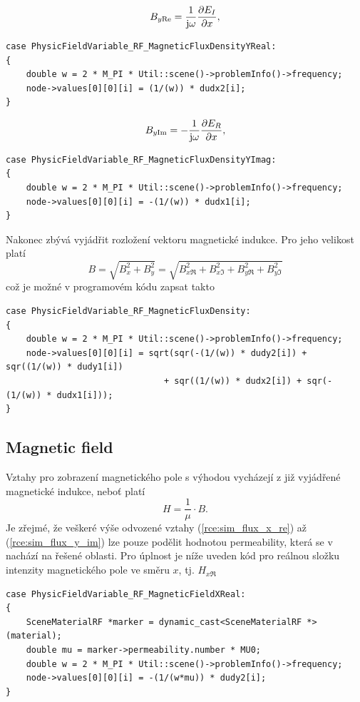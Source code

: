 \begin{equation}
	B_{y\mathrm{Re}} = \frac{1}{\mathrm{j}\omega}\frac{\partial E_I}{\partial x},
	\label{rce:sim_flux_y_re}
\end{equation}
\begin{verbatim}
case PhysicFieldVariable_RF_MagneticFluxDensityYReal:
{
    double w = 2 * M_PI * Util::scene()->problemInfo()->frequency;
    node->values[0][0][i] = (1/(w)) * dudx2[i];
}
\end{verbatim}
\begin{equation}
	B_{y\mathrm{Im}} = -\frac{1}{\mathrm{j}\omega}\frac{\partial E_R}{\partial x},
	\label{rce:sim_flux_y_im}
\end{equation}
\begin{verbatim}
case PhysicFieldVariable_RF_MagneticFluxDensityYImag:
{
    double w = 2 * M_PI * Util::scene()->problemInfo()->frequency;
    node->values[0][0][i] = -(1/(w)) * dudx1[i];
}
\end{verbatim}
Nakonec zbývá vyjádřit rozložení vektoru magnetické indukce. Pro jeho velikost platí
\begin{displaymath}
	B = \sqrt{B_{x}^{2} + B_{y}^{2}} = \sqrt{B_{x\Re}^{2} + B_{x\Im}^{2} + B_{y\Re}^{2} + B_{y\Im}^{2}}
\end{displaymath}
což je možné v programovém kódu zapsat takto
\begin{verbatim}
case PhysicFieldVariable_RF_MagneticFluxDensity:
{
    double w = 2 * M_PI * Util::scene()->problemInfo()->frequency;
    node->values[0][0][i] = sqrt(sqr(-(1/(w)) * dudy2[i]) + sqr((1/(w)) * dudy1[i])
                               + sqr((1/(w)) * dudx2[i]) + sqr(-(1/(w)) * dudx1[i]));
}
\end{verbatim}

\subsection*{Magnetic field}
Vztahy pro zobrazení magnetického pole s výhodou vycházejí z již vyjádřené magnetické indukce, neboť platí
\begin{displaymath}
H = \frac{1}{\mu}\cdot B.
\end{displaymath}
Je zřejmé, že veškeré výše odvozené vztahy (\ref{rce:sim_flux_x_re}) až (\ref{rce:sim_flux_y_im}) lze pouze podělit hodnotou permeability, která se v nachází na řešené oblasti. Pro úplnost je níže uveden kód pro reálnou složku intenzity magnetického pole ve směru $x$, tj. $H_{x\Re}$
\begin{verbatim}
case PhysicFieldVariable_RF_MagneticFieldXReal:
{
    SceneMaterialRF *marker = dynamic_cast<SceneMaterialRF *>(material);
    double mu = marker->permeability.number * MU0;
    double w = 2 * M_PI * Util::scene()->problemInfo()->frequency;
    node->values[0][0][i] = -(1/(w*mu)) * dudy2[i];
}
\end{verbatim}

